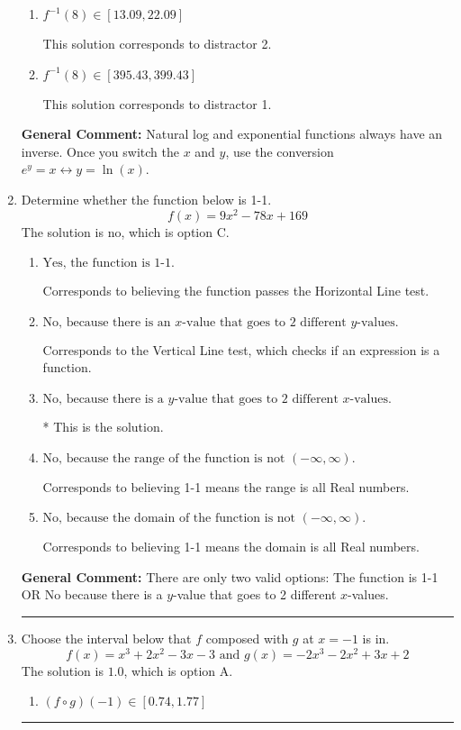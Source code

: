 \documentclass{extbook}[14pt]
\newcommand{\litem}[1]{\item #1

\rule{\textwidth}{0.4pt}}
\begin{document}
\begin{enumerate}
{\begin{enumerate}[label=\Alph*.]
 This solution corresponds to distractor 3.
\item \( f^{-1}(8) \in [13.09, 22.09] \)

 This solution corresponds to distractor 2.
\item \( f^{-1}(8) \in [395.43, 399.43] \)

 This solution corresponds to distractor 1.
\end{enumerate}

\textbf{General Comment:} Natural log and exponential functions always have an inverse. Once you switch the $x$ and $y$, use the conversion $ e^y = x \leftrightarrow y=\ln(x)$.
}
\litem{
Determine whether the function below is 1-1.
\[ f(x) = 9 x^2 - 78 x + 169 \]The solution is \( \text{no} \), which is option C.\begin{enumerate}[label=\Alph*.]
\item \( \text{Yes, the function is 1-1.} \)

Corresponds to believing the function passes the Horizontal Line test.
\item \( \text{No, because there is an $x$-value that goes to 2 different $y$-values.} \)

Corresponds to the Vertical Line test, which checks if an expression is a function.
\item \( \text{No, because there is a $y$-value that goes to 2 different $x$-values.} \)

* This is the solution.
\item \( \text{No, because the range of the function is not $(-\infty, \infty)$.} \)

Corresponds to believing 1-1 means the range is all Real numbers.
\item \( \text{No, because the domain of the function is not $(-\infty, \infty)$.} \)

Corresponds to believing 1-1 means the domain is all Real numbers.
\end{enumerate}

\textbf{General Comment:} There are only two valid options: The function is 1-1 OR No because there is a $y$-value that goes to 2 different $x$-values.
}
\litem{
Choose the interval below that $f$ composed with $g$ at $x=-1$ is in.
\[ f(x) = x^{3} +2 x^{2} -3 x -3 \text{ and } g(x) = -2x^{3} -2 x^{2} +3 x + 2 \]The solution is \( 1.0 \), which is option A.\begin{enumerate}[label=\Alph*.]
\item \( (f \circ g)(-1) \in [0.74, 1.77] \)


\end{enumerate}}
\end{enumerate}
\end{document}

